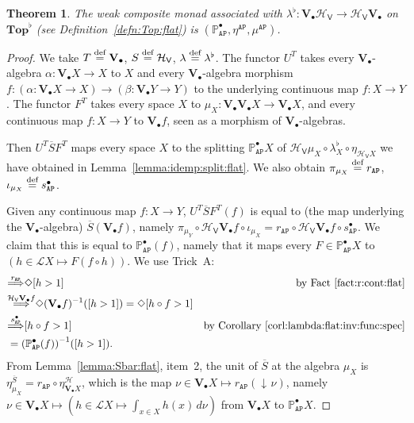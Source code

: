 \documentclass[preprint,12pt]{elsarticle}
\newcommand\eqdef{\mathrel{\buildrel \text{def}\over=}}
\DeclareMathOperator{\dc}{\downarrow\!}
\newcommand\Lform{\mathcal L}
\newcommand\Pred{\mathbb{P}}
\newcommand\Angel{{\mathtt{A}}}
\newcommand\Nature{{\mathtt{P}}}
\newcommand\AN{{\Angel\Nature}}
\newcommand\invto[1]{{\buildrel {#1} \over\Longrightarrow}}
\newcommand\Hoare{{\mathcal H}}
\newcommand\Vt{\mathsf{V}}
\newcommand\HV{\Hoare_\Vt}
\newcommand\Val{{\mathbf V}}
\newcommand\Topcat{\mathbf{Top}}
\newtheorem{theorem}{Theorem}[section]
\begin{document}
\begin{theorem}
  \label{thm:weaklift:flat}
  The weak composite monad associated with
  $\lambda^\flat \colon \Val_\bullet {\HV} \to \HV {\Val_\bullet}$ on
  $\Topcat^\flat$ (see Definition~\ref{defn:Top:flat}) is
  $(\Pred_\AN^\bullet, \eta^\AN, \mu^\AN)$.
\end{theorem}
\begin{proof}
  We take $T \eqdef \Val_\bullet$, $S \eqdef \HV$,
  $\lambda \eqdef \lambda^\flat$.  The functor $U^T$ takes every
  $\Val_\bullet$-algebra $\alpha \colon \Val_\bullet X \to X$ to $X$
  and every $\Val_\bullet$-algebra morphism
  $f \colon (\alpha \colon \Val_\bullet X \to X) \to (\beta \colon
  \Val_\bullet Y \to Y)$ to the underlying continuous map
  $f \colon X \to Y$.  The functor $F^T$ takes every space $X$ to
  $\mu_X \colon \Val_\bullet {\Val_\bullet X} \to \Val_\bullet X$, and
  every continuous map $f \colon X \to Y$ to $\Val_\bullet f$, seen as
  a morphism of $\Val_\bullet$-algebras.

  Then $U^T \overline S F^T$ maps every space $X$ to the splitting
  $\Pred_\AN^\bullet X$ of
  $\HV {\mu_X} \circ {\lambda^\flat_X} \circ \eta_{\HV X}$ we have
  obtained in Lemma~\ref{lemma:idemp:split:flat}.  We also obtain
  $\pi_{\mu_X} \eqdef r_\AN$, $\iota_{\mu_X} \eqdef s_\AN^\bullet$.

  Given any continuous map $f \colon X \to Y$, $U^T \overline S F^T
  (f)$ is equal to (the map underlying the $\Val_\bullet$-algebra)
  $\overline S (\Val_\bullet f)$, namely $\pi_{\mu_Y} \circ \HV
  {\Val_\bullet f} \circ \iota_{\mu_X} = r_\AN \circ \HV
  {\Val_\bullet f} \circ s_\AN^\bullet$.  We claim that this is equal
  to $\Pred_\AN^\bullet (f)$, namely that it maps every $F \in
  \Pred_\AN^\bullet X$ to $(h \in \Lform X \mapsto F (f \circ h))$.
  We use Trick~A:
  \begin{align*}
    [h > 1]
    & \invto{r_\AN}
      \Diamond {[h > 1]}
    & \text{by Fact~\ref{fact:r:cont:flat}} \\
    & \invto{\HV {\Val_\bullet f}}
      \Diamond {(\Val_\bullet f)^{-1} ([h > 1])}
      = \Diamond {[h \circ f > 1]} \\
    & \invto{s_\AN^\bullet}
      [h \circ f > 1]
    & \text{by Corollary~\ref{corl:lambda:flat:inv:func:spec}} \\
    & = {(\Pred_\AN^\bullet (f))}^{-1} ([h > 1]).
  \end{align*}
  From Lemma~\ref{lemma:Sbar:flat}, item~2, the unit of $\overline S$
  at the algebra $\mu_X$ is
  $\eta^{\overline S}_{\mu_X} = r_\AN \circ \eta^\Hoare_{\Val_\bullet
    X}$, which is the map
  $\nu \in \Val_\bullet X \mapsto r_\AN (\dc \nu)$, namely
  $\nu \in \Val_\bullet X \mapsto (h \in \Lform X \mapsto \int_{x \in
    X} h (x) \,d\nu)$ from $\Val_\bullet X$ to $\Pred_\AN^\bullet X$.


\end{proof}
\end{document}
